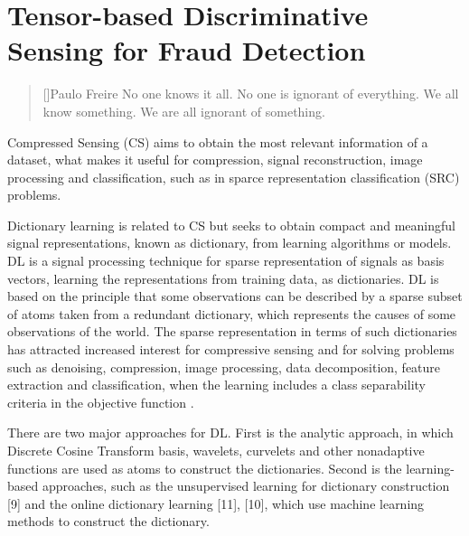 \chapter{Tensor-based Discriminative Sensing for Fraud Detection}
\label{ch:4_tensor_dl}

\begin{quotation}[]{Paulo Freire}
No one knows it all. No one is ignorant of everything. We all know something. We are all ignorant of something.
\end{quotation}


Compressed Sensing (CS) aims to obtain the most relevant information of a dataset, what makes it useful for compression, signal reconstruction, image processing and classification, such as in sparce representation classification (SRC) problems. 

Dictionary learning is related to CS but seeks to obtain compact and meaningful signal representations, known as dictionary, from learning algorithms or models. DL is a signal processing technique for sparse representation of signals as basis vectors, learning the representations from training data, as dictionaries. DL is based on the principle that some observations can be described by a sparse subset of atoms taken from a redundant dictionary, which represents the causes of some observations of the world. The sparse representation in terms of such dictionaries has attracted increased interest for compressive sensing and for solving problems such as denoising, compression, image processing, data decomposition, feature extraction and classification, when the learning includes a class separability criteria in the objective function \cite{tosic2011dictionary, zhang2010discriminative, zhu2016coupled,ravishankar2011mr}. 

There are two major approaches for DL. First is the analytic approach, in which Discrete Cosine Transform basis, wavelets, curvelets and other nonadaptive functions are used as atoms to construct the dictionaries. Second is the learning-based approaches, such as the unsupervised learning for dictionary construction [9] and the online dictionary learning [11], [10], which use machine learning methods to construct the dictionary. 

